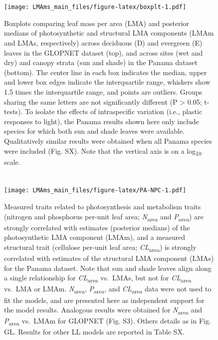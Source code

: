 \documentclass[
  12pt,
]{article}
\begin{document}
\newpage

\hypertarget{section-6}{%
\section{}\label{section-6}}

\begin{figure}
\centering
\texttt{[image: LMAms\_main\_files/figure-latex/boxplt-1.pdf]}
\caption{\label{fig:boxplt}Boxplots comparing leaf mass per area (LMA) and posterior medians of photosynthetic and structural LMA components (LMAm and LMAs, respectively) across deciduous (D) and evergreen (E) leaves in the GLOPNET dataset (top), and across sites (wet and dry) and canopy strata (sun and shade) in the Panama dataset (bottom). The center line in each box indicates the median, upper and lower box edges indicate the interquartile range, whiskers show 1.5 times the interquartile range, and points are outliers. Groups sharing the same letters are not significantly different (P \textgreater{} 0.05; t-tests). To isolate the effects of intraspecific variation (i.e., plastic responses to light), the Panama results shown here only include species for which both sun and shade leaves were available. Qualitatively similar results were obtained when all Panama species were included (Fig. SX). Note that the vertical axis is on a log\textsubscript{10} scale.}
\end{figure}

\newpage

\hypertarget{section-7}{%
\section{}\label{section-7}}

\begin{figure}
\centering
\texttt{[image: LMAms\_main\_files/figure-latex/PA-NPC-1.pdf]}
\caption{\label{fig:PA-NPC}Measured traits related to photosynthesis and metabolism traits (nitrogen and phosphorus per-unit leaf area; \emph{N}\textsubscript{area} and \emph{P}\textsubscript{area}) are strongly correlated with estimates (posterior medians) of the photosynthetic LMA component (LMAm), and a measured structural trait (cellulose per-unit leaf area; \emph{CL}\textsubscript{area}) is strongly correlated with estimates of the structural LMA component (LMAs) for the Panama dataset. Note that sun and shade leaves align along a single relationship for \emph{CL}\textsubscript{area} vs.~LMAs, but not for \emph{CL}\textsubscript{area} vs.~LMA or LMAm. \emph{N}\textsubscript{area}, \emph{P}\textsubscript{area}, and \emph{CL}\textsubscript{area} data were not used to fit the models, and are presented here as independent support for the model results. Analogous results were obtained for \emph{N}\textsubscript{area} and \emph{P}\textsubscript{area} vs.~LMAm for GLOPNET (Fig. S3). Others details as in Fig. GL. Results for other LL models are reported in Table SX.}
\end{figure}
\end{document}
